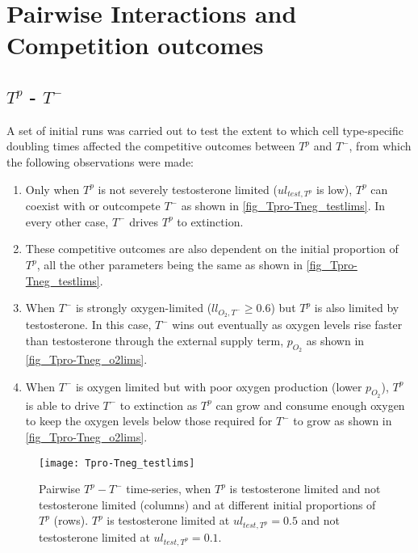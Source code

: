 
\chapter{Pairwise Interactions and Competition outcomes}
\section{$T^p$ - $T^-$}
A set of initial runs was carried out to test the extent to which cell type-specific doubling times affected the competitive outcomes between $T^p$ and $T^-$, from which the following observations were made:
\begin{enumerate}
  \item Only when $T^p$ is not severely testosterone limited ($ul_{test,T^p}$ is low), $T^p$ can coexist with or outcompete $T^-$ as shown in \autoref{fig_Tpro-Tneg_testlims}. In every other case, $T^-$ drives $T^p$ to extinction.
  \item These competitive outcomes are also dependent on the initial proportion of $T^p$, all the other parameters being the same as shown in \autoref{fig_Tpro-Tneg_testlims}.
  \item When $T^-$ is strongly oxygen-limited ($ll_{O_2,T^-} \geq 0.6$) but $T^p$ is also limited by testosterone. In this case, $T^-$ wins out eventually as oxygen levels rise faster than testosterone through the external supply term, $p_{O_2}$ as shown in \autoref{fig_Tpro-Tneg_o2lims}.
  \item When $T^-$ is oxygen limited but with poor oxygen production (lower $p_{O_2}$), $T^p$ is able to drive $T^-$ to extinction as $T^p$ can grow and consume enough oxygen to keep the oxygen levels below those required for $T^-$ to grow as shown in \autoref{fig_Tpro-Tneg_o2lims}.
\end{enumerate}

\begin{figure}[h!]
  \centering
  \texttt{[image: Tpro-Tneg\_testlims]}
  \caption[Pairwise $T^p - T^-$ time-series, testosterone limitation]{Pairwise $T^p - T^-$ time-series, when $T^p$ is testosterone limited and not testosterone limited (columns) and at different initial proportions of $T^p$ (rows). $T^p$ is testosterone limited at $ul_{test,T^p}=0.5$ and not testosterone limited at $ul_{test,T^p}=0.1$.}
  \label{fig_Tpro-Tneg_testlims}
\end{figure}

